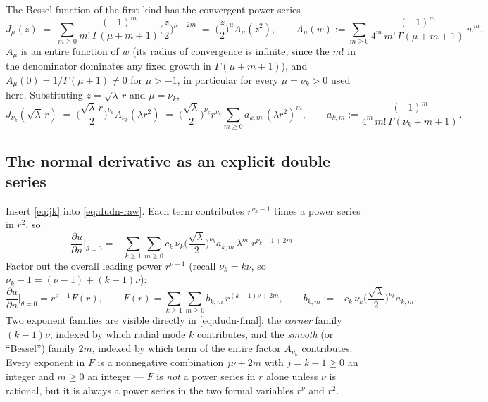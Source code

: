 \documentclass[11pt]{article}
\theoremstyle{remark}
\newcommand{\pdn}[1]{\frac{\partial #1}{\partial n}}
\begin{document}
The Bessel function of the first kind has the convergent power series
\begin{equation}\label{eq:jseries}
  J_\mu(z) \;=\; \sum_{m\ge0} \frac{(-1)^m}{m!\,\Gamma(\mu+m+1)}\Big(\frac z2\Big)^{\mu+2m}
  \;=\; \Big(\frac z2\Big)^{\!\mu} A_\mu(z^2), \qquad
  A_\mu(w) := \sum_{m\ge0} \frac{(-1)^m}{4^m\,m!\,\Gamma(\mu+m+1)}\,w^m.
\end{equation}
$A_\mu$ is an entire function of $w$ (its radius of convergence is infinite, since the $m!$ in the
denominator dominates any fixed growth in $\Gamma(\mu+m+1)$), and $A_\mu(0)=1/\Gamma(\mu+1)\neq0$
for $\mu>-1$, in particular for every $\mu=\nu_k>0$ used here. Substituting $z=\sqrt\lambda\,r$
and $\mu=\nu_k$,
\begin{equation}\label{eq:jk}
  J_{\nu_k}(\sqrt\lambda\,r) \;=\; \Big(\frac{\sqrt\lambda\,r}{2}\Big)^{\!\nu_k} A_{\nu_k}(\lambda r^2)
  \;=\; \Big(\frac{\sqrt\lambda}{2}\Big)^{\!\nu_k} r^{\nu_k}
        \sum_{m\ge0} a_{k,m}\,(\lambda r^2)^m,
  \qquad a_{k,m} := \frac{(-1)^m}{4^m\,m!\,\Gamma(\nu_k+m+1)}.
\end{equation}

\subsection{The normal derivative as an explicit double series}

Insert \eqref{eq:jk} into \eqref{eq:dudn-raw}. Each term contributes $r^{\nu_k-1}$ times a power
series in $r^2$, so
\begin{equation}\label{eq:dudn-double}
  \pdn{u}\bigg|_{\theta=0}
  = -\sum_{k\ge1}\sum_{m\ge0} c_k\,\nu_k\Big(\frac{\sqrt\lambda}2\Big)^{\!\nu_k} a_{k,m}\,\lambda^m\;
    r^{\nu_k-1+2m}.
\end{equation}
Factor out the overall leading power $r^{\nu-1}$ (recall $\nu_k=k\nu$, so $\nu_k-1 = (\nu-1)+(k-1)\nu$):
\begin{equation}\label{eq:dudn-final}
  \pdn{u}\bigg|_{\theta=0} = r^{\nu-1} F(r), \qquad
  F(r) = \sum_{k\ge1}\sum_{m\ge0} b_{k,m}\, r^{(k-1)\nu+2m},
  \qquad
  b_{k,m} := -c_k\,\nu_k\Big(\frac{\sqrt\lambda}2\Big)^{\!\nu_k}\!a_{k,m}.
\end{equation}
Two exponent families are visible directly in \eqref{eq:dudn-final}: the \emph{corner} family
$(k-1)\nu$, indexed by which radial mode $k$ contributes, and the \emph{smooth} (or ``Bessel'')
family $2m$, indexed by which term of the entire factor $A_{\nu_k}$ contributes. Every exponent in
$F$ is a nonnegative combination $j\nu+2m$ with $j=k-1\ge0$ an integer and $m\ge0$ an integer ---
$F$ is \emph{not} a power series in $r$ alone unless $\nu$ is rational, but it is always a power
series in the two formal variables $r^\nu$ and $r^2$.
\end{document}
